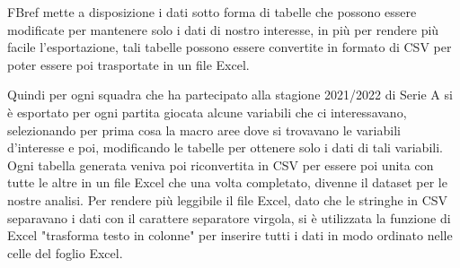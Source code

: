 FBref mette a disposizione i dati sotto forma di tabelle che possono essere modificate per mantenere solo i dati di nostro interesse, in più per rendere più facile l'esportazione, tali tabelle possono essere convertite in formato di CSV per poter essere poi trasportate in un file Excel. 

Quindi per ogni squadra che ha partecipato alla stagione 2021/2022 di Serie A si è esportato per ogni partita giocata alcune variabili che ci interessavano, selezionando per prima cosa la macro aree dove si trovavano le variabili d'interesse e poi, modificando le tabelle per ottenere solo i dati di tali variabili. Ogni tabella generata veniva poi riconvertita in CSV per essere poi unita con tutte le altre in un file Excel che una volta completato, divenne il dataset per le nostre analisi. Per rendere più leggibile il file Excel, dato che le stringhe in CSV separavano i dati con il carattere separatore virgola, si è utilizzata la funzione di Excel "trasforma testo in colonne" per inserire tutti i dati in modo ordinato nelle celle del foglio Excel.


